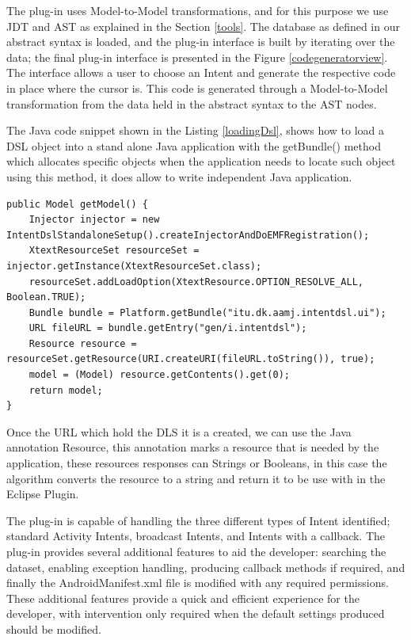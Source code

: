 The plug-in uses Model-to-Model transformations, and for this purpose we use JDT and AST as explained in the Section \ref{tools}. The database as defined in our abstract syntax is loaded, and the plug-in interface is built by iterating over the data; the final plug-in interface is presented in the Figure \ref{codegeneratorview}. The interface allows a user to choose an Intent and generate the respective code in place where the cursor is. This code is generated through a Model-to-Model transformation from the data held in the abstract syntax to the AST nodes.

The Java code snippet shown in the Listing \ref{loadingDsl}, shows how to load a DSL object into a stand alone Java application with the getBundle() method which allocates specific objects when the application needs to locate such object using this method, it does allow to write independent Java application.

{\footnotesize\begin{lstlisting}[label=loadingDsl,caption=Loading a DSL object into Java application]
public Model getModel() {
	Injector injector = new IntentDslStandaloneSetup().createInjectorAndDoEMFRegistration();
	XtextResourceSet resourceSet = injector.getInstance(XtextResourceSet.class);
	resourceSet.addLoadOption(XtextResource.OPTION_RESOLVE_ALL, Boolean.TRUE);
	Bundle bundle = Platform.getBundle("itu.dk.aamj.intentdsl.ui");
	URL fileURL = bundle.getEntry("gen/i.intentdsl");
	Resource resource = resourceSet.getResource(URI.createURI(fileURL.toString()), true);
	model = (Model) resource.getContents().get(0);
	return model;
}
\end{lstlisting}}

Once the URL which hold the DLS it is a created, we can use the Java annotation Resource, this annotation marks a resource that is needed by the application, these resources responses can Strings or Booleans, in this case the algorithm converts the resource to a string and return it to be use with in the Eclipse Plugin. 
 
The plug-in is capable of handling the three different types of Intent identified; standard Activity Intents, broadcast Intents, and Intents with a callback. The plug-in provides several additional features to aid the developer: searching the dataset, enabling exception handling, producing callback methods if required, and finally the AndroidManifest.xml file is modified with any required permissions. These additional features provide a quick and efficient experience for the developer, with intervention only required when the default settings produced should be modified.

